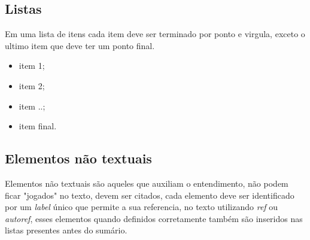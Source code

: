 \subsection{Listas}

Em uma lista de itens cada item deve ser terminado por ponto e virgula, exceto o ultimo item que deve ter um ponto final.

\begin{itemize}
\item item 1;
\item item 2;
\item item ..;
\item item final.
\end{itemize}

\subsection{Elementos não textuais}

Elementos não textuais são aqueles que auxiliam o entendimento, não podem ficar "jogados" no texto, devem ser citados, cada elemento deve ser identificado por um \emph{label} único que permite a sua referencia, no texto utilizando \emph{ref} ou \emph{autoref}, esses elementos quando definidos corretamente também são inseridos nas listas presentes antes do sumário.






